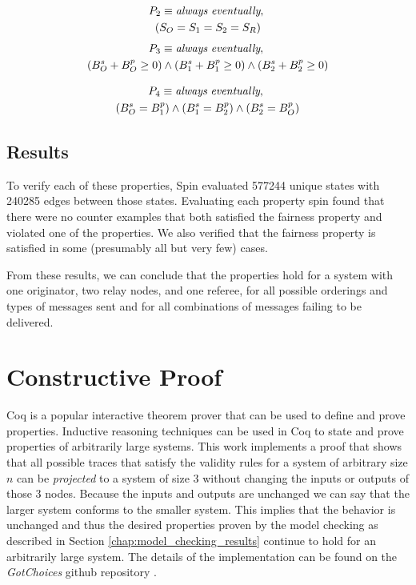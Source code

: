 \documentclass[runningheads]{llncs}
\newcommand{\originatorstate}{S_O}
\newcommand{\relayastate}{S_1}
\newcommand{\relaybstate}{S_2}
\newcommand{\refstate}{S_R}
\newcommand{\originatorsuccbal}{B^s_O}
\newcommand{\relayasuccbal}{B^s_1}
\newcommand{\relaybsuccbal}{B^s_2}
\newcommand{\originatorpredbal}{B^p_O}
\newcommand{\relayapredbal}{B^p_1}
\newcommand{\relaybpredbal}{B^p_2}
\newcommand{\always}{\emph{always}}
\newcommand{\eventually}{\emph{eventually}}
\begin{document}
\begin{multline*}
P_2 \equiv \always\ \eventually,\ \\
    (\originatorstate = \relayastate = \relaybstate = \refstate) \\
\end{multline*}
\begin{multline*}
P_3 \equiv \always\ \eventually,\ \\
    (\originatorsuccbal + \originatorpredbal \ge 0) \wedge
    (\relayasuccbal + \relayapredbal \ge 0) \wedge
    (\relaybsuccbal + \relaybpredbal \ge 0) \\
\end{multline*}

\begin{multline*}
P_4 \equiv \always\ \eventually,\ \\
    (\originatorsuccbal = \relayapredbal) \wedge
    (\relayasuccbal = \relaybpredbal) \wedge
    (\relaybsuccbal = \originatorpredbal) \\
\end{multline*}

\subsection{Results}

To verify each of these properties, Spin evaluated 
577244 unique states with 240285 edges between those states. Evaluating each property spin found that there were no counter examples that both satisfied the fairness property and violated one of the properties. We also verified that the fairness property is satisfied in some (presumably all but very few) cases. 

From these results, we can conclude that the properties hold for a system with one originator, two relay nodes, and one referee, for all possible orderings and types of messages sent and for all combinations of messages failing to be delivered.

\section{Constructive Proof} \label{chap:coq_results}

Coq is a popular interactive theorem prover that can be used to define and prove properties. Inductive reasoning techniques can be used in Coq to state and prove properties of arbitrarily large systems. This work implements a proof that shows that all possible traces that satisfy the validity rules for a system of arbitrary size $n$ can be \emph{projected} to a system of size $3$ without changing the inputs or outputs of those 3 nodes. Because the inputs and outputs are unchanged we can say that the larger system conforms to the smaller system. This implies that the behavior is unchanged and thus the desired properties proven by the model checking as described in Section \ref{chap:model_checking_results} continue to hold for an arbitrarily large system.
The details of the implementation can be 
found on the \emph{GotChoices} github repository \cite{bateman_myCHIPs}. 
\end{document}
